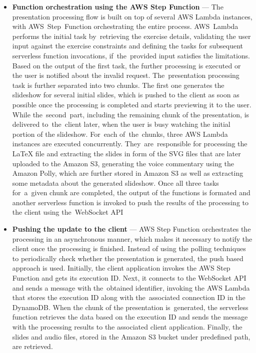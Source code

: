 \begin{itemize}
   \item \textbf{Function orchestration using the AWS Step Function} --- The presentation processing flow is built on top of several AWS Lambda instances, with AWS~Step~Function orchestrating the entire process.
   AWS~Lambda performs the initial task by~retrieving the exercise details, validating the user input against the exercise constraints and defining the tasks for subsequent serverless function invocations, if~the~provided input satisfies the limitations.
   Based on the output of the first task, the further processing is executed or the user is notified about the invalid request.
   The~presentation processing task is further separated into two chunks. 
   The first one generates the slideshow for several initial slides, which is pushed to the client as soon as possible once the processing is completed and starts previewing it to the user. While the~second~part, including the remaining chunk of the presentation, is delivered to~the~client later, when the user is busy watching the initial portion of the slideshow.
   For~each of~the~chunks, three AWS Lambda instances are executed concurrently. They~are~responsible for processing the LaTeX file and extracting the slides in form of the SVG files that are later uploaded to the Amazon S3, generating the voice commentary using the Amazon Polly, which are further stored in Amazon S3 as well as extracting some metadata about the generated slideshow.
   Once all three tasks for~a~given chunk are completed, the output of the functions is formated and another serverless function is invoked to push the results of the processing to the client using the~WebSocket API
   \item \textbf{Pushing the update to the client} --- AWS Step Function orchestrates the processing in an asynchronous manner, which makes it necessary to notify the client once the processing is finished.
   Instead of using the polling techniques to periodically check whether the presentation is generated, the push based approach is used.
   Initially, the client application invokes the AWS Step Function and gets its execution ID.
   Next, it connects to the WebSocket API and sends a message with the~obtained identifier, invoking the AWS Lambda that stores the execution ID along with the~associated connection ID in the DynamoDB.
   When the chunk of the presentation is~generated, the serverless function retrieves the data based on the execution ID and sends the message with the processing results to the associated client application.
   Finally, the slides and audio files, stored in the Amazon S3 bucket under predefined path, are retrieved.
\end{itemize}

